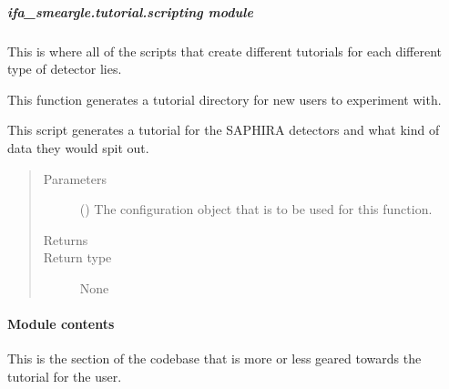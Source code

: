 \documentclass[letterpaper,10pt,english]{sphinxmanual}
\begin{document}
\subparagraph{ifa\_smeargle.tutorial.scripting module}
\label{\detokenize{docstrings/ifa_smeargle.tutorial.scripting:module-ifa_smeargle.tutorial.scripting}}\label{\detokenize{docstrings/ifa_smeargle.tutorial.scripting:ifa-smeargle-tutorial-scripting-module}}\label{\detokenize{docstrings/ifa_smeargle.tutorial.scripting::doc}}
This is where all of the scripts that create different tutorials
for each different type of detector lies.

\begin{fulllineitems}
\label{\detokenize{docstrings/ifa_smeargle.tutorial.scripting:ifa_smeargle.tutorial.scripting.script_generate_saphira_tutorial}}
This function generates a tutorial directory for new users
to experiment with.

This script generates a tutorial for the SAPHIRA detectors and
what kind of data they would spit out.
\begin{quote}\begin{description}
\item[{Parameters}] \leavevmode
{} () \textendash{} The configuration object that is to be used for this
function.

\item[{Returns}] \leavevmode


\item[{Return type}] \leavevmode
None

\end{description}\end{quote}

\end{fulllineitems}



\paragraph{Module contents}
\label{\detokenize{docstrings/ifa_smeargle.tutorial:module-ifa_smeargle.tutorial}}\label{\detokenize{docstrings/ifa_smeargle.tutorial:module-contents}}
This is the section of the code\sphinxhyphen{}base that is more or less geared
towards the tutorial for the user.
\end{document}
